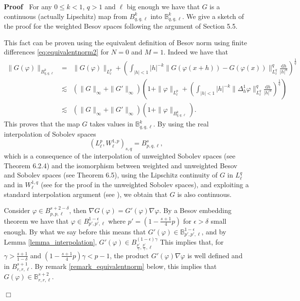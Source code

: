 \documentclass[a4paper,10pt]{article}
\newcommand{\mathd}{\mathrm{d}}
\newenvironment{proof}{\noindent\textbf{Proof\ }}{\hspace*{\fill}$\Box$\medskip}
\begin{document}
\begin{proof}
  For any $0 \leq k < 1$, $q > 1$ and $\ell$ big enough we have that $G$ is a
  continuous (actually Lipschitz) map from $B^k_{q, q, \ell}$ into
  $\mathbb{B}^k_{q, q, \ell}$. We give a sketch of the proof for the weighted
  Besov spaces following the argument of {\cite{Runst1996}} Section 5.5.
  
  This fact can be proven using the equivalent definition of Besov norm using
  finite differences {\eqref{eq:equivalentnorm2}} for $N = 0$ and $M = 1$.
  Indeed we have that
  \begin{eqnarray}
    \| G (\varphi) \|_{B^k_{q, q, \ell}} & = & \| G (\varphi) \|_{L^p_{\ell}}
    + \left( \int_{| h | < 1} | h |^{- k} \| G (\varphi (x + h)) - G (\varphi
    (x)) \|_{L^q_{\ell}}^q \frac{\mathd h}{| h |^n} \right)^{\frac{1}{q}}
    \nonumber\\
    & \lesssim & (\| G \|_{\infty} + \| G' \|_{\infty}) \left( 1 + \| \varphi
    \|_{L^p_{\ell}} + \left( \int_{| h | < 1} | h |^{- k} \| \Delta^1_h
    \varphi \|_{L^q_{\ell}}^q \frac{\mathd h}{| h |^n} \right)^{\frac{1}{q}}
    \right) \nonumber\\
    & \lesssim & (\| G \|_{\infty} + \| G' \|_{\infty}) (1 + \| \varphi
    \|_{B^k_{q, q, \ell}}) . \nonumber
  \end{eqnarray}
  This proves that the map $G$ takes values in $\mathbb{B}^k_{q, q, \ell}$. By
  using the real interpolation of Sobolev spaces
  \[ (L^p_{\ell}, W^{1, p}_{\ell})_{s, q} = B^s_{p, q, \ell}, \]
  which is a consequence of the interpolation of unweighted Sobolev spaces
  (see {\cite{Joran1976}} Theorem 6.2.4) and the isomorphism between weighted
  and unweighted Besov and Sobolev spaces (see {\cite{Triebel2006}} Theorem
  6.5), using the Lipschitz continuity of $G$ in $L^q_{\ell}$ and in $W^{1,
  q}_{\ell}$ (see {\cite{Bourdaud2011}} for the proof in the unweighted
  Sobolev spaces), and exploiting a standard interpolation argument (see
  {\cite{Maligranda}}), we obtain that $G$ is also continuous.
  
  Consider $\varphi \in B^{s + 2 - \delta}_{p, p, \ell}$, then $\nabla G
  (\varphi) = G' (\varphi) \nabla \varphi$. By a Besov embedding theorem we
  have that $\varphi \in B^{1 - \epsilon}_{p', p', \ell}$ where $p' = \left( 1
  - \frac{s + 1}{4} p \right)$ for $\epsilon > \delta$ small enough. By what
  we say before this means that $G' (\varphi) \in \mathbb{B}^{1 -
  \epsilon}_{p', p', \ell}$, and by Lemma \ref{lemma_interpolation}, $G'
  (\varphi) \in B^{(1 - \epsilon) \gamma}_{\frac{p'}{\gamma},
  \frac{p'}{\gamma}, \ell}$ This implies that, for $\gamma > \frac{s + 1}{1
  - \delta}$ and $\left( 1 - \frac{s + 1}{4} p \right) \gamma < p - 1$, the
  product $G' (\varphi) \nabla \varphi$ is well defined and in $B^{s + 1}_{r,
  r, \ell}$. By remark \ref{remark_equivalentnorm} below, this implies that $G
  (\varphi) \in \mathbb{B}^{s + 2}_{r, r, \ell}$.
  

\end{proof}
\end{document}
